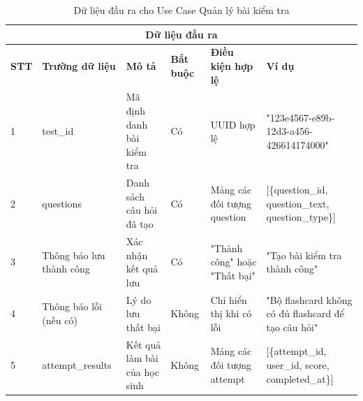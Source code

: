 \documentclass[../DoAn.tex]{subfiles}
\begin{document}
\begin{table}[h!]
\centering
\begin{tabular}{|m{1cm}|m{2.5cm}|m{3cm}|m{1cm}|m{2.5cm}|m{3.5cm}|}
    \hline
    \multicolumn{6}{|c|}{\textbf{Dữ liệu đầu ra}} \\
    \hline
    \textbf{STT} & \textbf{Trường dữ liệu} & \textbf{Mô tả} & \textbf{Bắt buộc} & \textbf{Điều kiện hợp lệ} & \textbf{Ví dụ} \\
    \hline
    1 & test\_id & Mã định danh bài kiểm tra & Có & UUID hợp lệ & "123e4567-e89b-12d3-a456-426614174000" \\
    \hline
    2 & questions & Danh sách câu hỏi đã tạo & Có & Mảng các đối tượng question & [\{question\_id, question\_text, question\_type\}] \\
    \hline
    3 & Thông báo lưu thành công & Xác nhận kết quả lưu & Có & "Thành công" hoặc "Thất bại" & "Tạo bài kiểm tra thành công" \\
    \hline
    4 & Thông báo lỗi (nếu có) & Lý do lưu thất bại & Không & Chỉ hiển thị khi có lỗi & "Bộ flashcard không có đủ flashcard để tạo câu hỏi" \\
    \hline
    5 & attempt\_results & Kết quả làm bài của học sinh & Không & Mảng các đối tượng attempt & [\{attempt\_id, user\_id, score, completed\_at\}] \\
    \hline
\end{tabular}
\caption{Dữ liệu đầu ra cho Use Case Quản lý bài kiểm tra}
\end{table}
\end{document}
